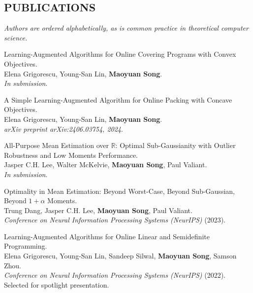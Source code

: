 \documentclass[margin, 10pt]{res-short} %
\begin{document}
\begin{resume}
\section{PUBLICATIONS}
{\it Authors are ordered alphabetically, as is common practice in theoretical computer science.}
\begin{etaremune}
\item Learning-Augmented Algorithms for Online Covering Programs with Convex Objectives.\\
Elena Grigorescu, Young-San Lin, {\bf Maoyuan Song}.\\
\emph{In submission}.
\item A Simple Learning-Augmented Algorithm for Online Packing with Concave Objectives.\\
Elena Grigorescu, Young-San Lin, {\bf Maoyuan Song}.\\
\emph{arXiv preprint arXiv:2406.03754, 2024}.
\item All-Purpose Mean Estimation over $\mathbb{R}$: Optimal Sub-Gaussianity with Outlier Robustness and Low Moments Performance.\\
Jasper C.H. Lee, Walter McKelvie, {\bf Maoyuan Song}, Paul Valiant.\\
\emph{In submission}.
\item Optimality in Mean Estimation: Beyond Worst-Case, Beyond Sub-Gaussian, Beyond $1 + \alpha$ Moments.\\
Trung Dang, Jasper C.H. Lee, {\bf Maoyuan Song}, Paul Valiant.\\
\emph{Conference on Neural Information Processing Systems (NeurIPS)} (2023).
\item Learning-Augmented Algorithms for Online Linear and Semidefinite Programming.\\
Elena Grigorescu, Young-San Lin, Sandeep Silwal, {\bf Maoyuan Song}, Samson Zhou.\\
\emph{Conference on Neural Information Processing Systems (NeurIPS)} (2022). Selected for spotlight presentation.
\end{etaremune}


\end{resume}
\end{document}
